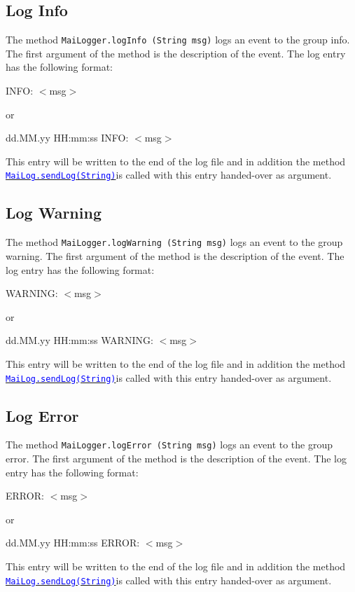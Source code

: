 \documentclass{article}
\newcommand{\refh}[2]{\hyperref[#1] {\textcolor{blue}{#2}}}
\newcommand{\sendLog}{\refh{setup_interface}{\lstinline|MaiLog.sendLog(String)|}}
\begin{document}
    \subsection{Log Info}
	\label{logging_info}
    The method \lstinline|MaiLogger.logInfo (String msg)| logs an event to the group info.
    The first argument of the method is the description of the event.
    The log entry has the following format:
    \begin{description}
        \item INFO: $<$msg$>$
        \item or
        \item dd.MM.yy HH:mm:ss INFO: $<$msg$>$
    \end{description}
    This entry will be written to the end of the log file and in addition the method \sendLog is called with this entry handed-over as argument.

    \subsection{Log Warning}
    \label{logging_warning}
    The method \lstinline|MaiLogger.logWarning (String msg)| logs an event to the group warning.
    The first argument of the method is the description of the event.
    The log entry has the following format:
    \begin{description}
        \item WARNING: $<$msg$>$
        \item or
        \item dd.MM.yy HH:mm:ss WARNING: $<$msg$>$
    \end{description}
    This entry will be written to the end of the log file and in addition the method \sendLog is called with this entry handed-over as argument.

    \subsection{Log Error}
    \label{logging_error}
    The method \lstinline|MaiLogger.logError (String msg)| logs an event to the group error.
    The first argument of the method is the description of the event.
    The log entry has the following format:
    \begin{description}
        \item ERROR: $<$msg$>$
        \item or
        \item dd.MM.yy HH:mm:ss ERROR: $<$msg$>$
    \end{description}
    This entry will be written to the end of the log file and in addition the method \sendLog is called with this entry handed-over as argument.
\end{document}

